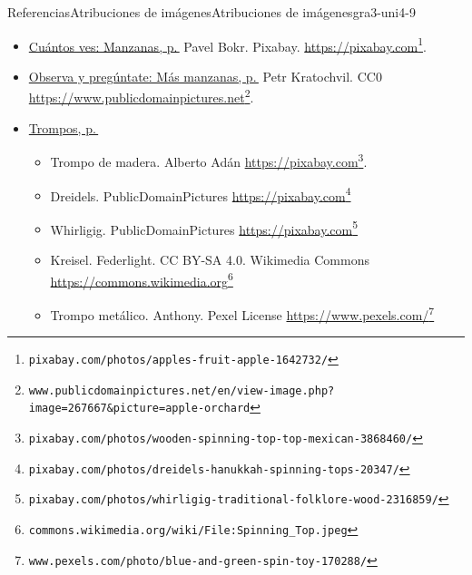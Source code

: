 \begin{references-section}{Referencias}{Atribuciones de imágenes}{}{Atribuciones de imágenes}{}{}{gra3-uni4-9}
%
\begin{itemize}[label=\textbullet]
\item{}\hyperref[warm-cuantosVes-Manzanas]{Cuántos ves: Manzanas, p.\,\pageref{warm-cuantosVes-Manzanas}} Pavel Bokr. Pixabay. \href{https://pixabay.com/photos/apples-fruit-apple-1642732/}{https:\slash{}\slash{}pixabay.com}\footnote{\nolinkurl{pixabay.com/photos/apples-fruit-apple-1642732/}\label{gra3-uni4-9-2-1-3}}.%
\item{}\hyperref[warm-observa-arbolManzanas]{Observa y pregúntate: Más manzanas, p.\,\pageref{warm-observa-arbolManzanas}}  Petr Kratochvil. CC0 \href{https://www.publicdomainpictures.net/en/view-image.php?image=267667\&picture=apple-orchard}{https:\slash{}\slash{}www.publicdomainpictures.net}\footnote{\nolinkurl{www.publicdomainpictures.net/en/view-image.php?image=267667\&picture=apple-orchard}\label{gra3-uni4-9-2-2-3}}.%
\item{}\hyperref[act-trompos]{Trompos, p.\,\pageref{act-trompos}}%
%
\begin{itemize}[label=$\circ$]
\item{}Trompo de madera. Alberto Adán \href{https://pixabay.com/photos/wooden-spinning-top-top-mexican-3868460/}{https:\slash{}\slash{}pixabay.com}\footnote{\nolinkurl{pixabay.com/photos/wooden-spinning-top-top-mexican-3868460/}\label{gra3-uni4-9-2-3-2-1-2}}.%
\item{}Dreidels. PublicDomainPictures \href{https://pixabay.com/photos/dreidels-hanukkah-spinning-tops-20347/}{https:\slash{}\slash{}pixabay.com}\footnote{\nolinkurl{pixabay.com/photos/dreidels-hanukkah-spinning-tops-20347/}\label{gra3-uni4-9-2-3-2-2-2}}%
\item{}Whirligig. PublicDomainPictures \href{https://pixabay.com/photos/whirligig-traditional-folklore-wood-2316859/}{https:\slash{}\slash{}pixabay.com}\footnote{\nolinkurl{pixabay.com/photos/whirligig-traditional-folklore-wood-2316859/}\label{gra3-uni4-9-2-3-2-3-2}}%
\item{}Kreisel. Federlight. CC BY-SA 4.0. Wikimedia Commons\\\href{https://commons.wikimedia.org/wiki/File:Spinning_Top.jpeg}{https:\slash{}\slash{}commons.wikimedia.org}\footnote{\nolinkurl{commons.wikimedia.org/wiki/File:Spinning_Top.jpeg}\label{gra3-uni4-9-2-3-2-4-2}}%
\item{}Trompo metálico.  Anthony. Pexel License \href{https://www.pexels.com/photo/blue-and-green-spin-toy-170288/}{https:\slash{}\slash{}www.pexels.com\slash{}}\footnote{\nolinkurl{www.pexels.com/photo/blue-and-green-spin-toy-170288/}\label{gra3-uni4-9-2-3-2-5-2}}%

\end{itemize}
\end{itemize}
\end{references-section}
